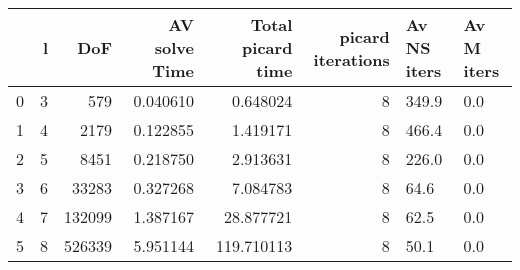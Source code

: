 \begin{tabular}{lrrrrrll}
\toprule
{} &  l &     DoF &  AV solve Time &  Total picard time &  picard iterations & Av NS iters & Av M iters \\
\midrule
0 &  3 &     579 &       0.040610 &           0.648024 &                  8 &       349.9 &        0.0 \\
1 &  4 &    2179 &       0.122855 &           1.419171 &                  8 &       466.4 &        0.0 \\
2 &  5 &    8451 &       0.218750 &           2.913631 &                  8 &       226.0 &        0.0 \\
3 &  6 &   33283 &       0.327268 &           7.084783 &                  8 &        64.6 &        0.0 \\
4 &  7 &  132099 &       1.387167 &          28.877721 &                  8 &        62.5 &        0.0 \\
5 &  8 &  526339 &       5.951144 &         119.710113 &                  8 &        50.1 &        0.0 \\
\bottomrule
\end{tabular}
